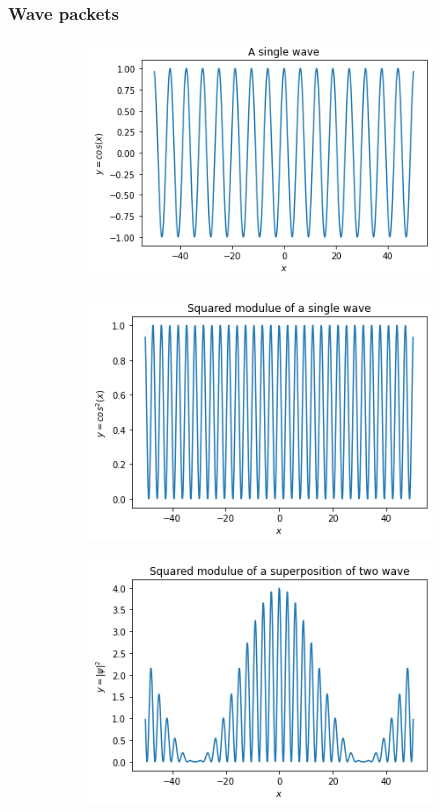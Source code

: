 \documentclass{beamer}
\begin{document}
\begin{frame}
\frametitle{Wave packets}
\begin{figure}
\begin{subfigure}{0.4\textwidth}
\includegraphics[scale=0.3]{one-wave}
\end{subfigure}
\hfill
\begin{subfigure}{0.4\textwidth}
\includegraphics[scale=0.3]{one-wave-sq}
\end{subfigure}
\medskip
\begin{subfigure}{0.4\textwidth}
\includegraphics[scale=0.3]{two-waves-sq}

\end{subfigure}
\end{figure}
\end{frame}
\end{document}
